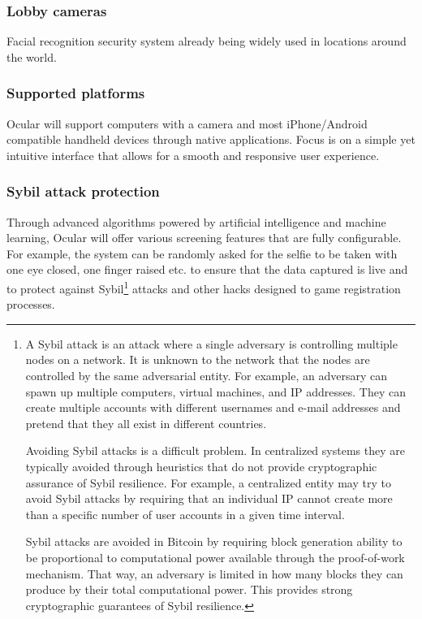 \documentclass[a4paper]{article}
\begin{document}
\subsubsection*{Lobby cameras}
Facial recognition security system already being widely used in locations around the world.

\subsubsection*{Supported platforms}

Ocular will support computers with a camera and most iPhone/Android compatible handheld devices through native applications. Focus is on a simple yet intuitive interface that allows for a smooth and responsive user experience.

\subsubsection*{Sybil attack protection}

Through advanced algorithms powered by artificial intelligence and machine learning, Ocular will offer various screening features that are fully configurable. For example, the system can be randomly asked for the selfie to be taken with one eye closed, one finger raised etc. to ensure that the data captured is live and to protect against Sybil\footnote{A Sybil attack is an attack where a single adversary is controlling multiple nodes on a network. It is unknown to the network that the nodes are controlled by the same adversarial entity. For example, an adversary can spawn up multiple computers, virtual machines, and IP addresses. They can create multiple accounts with different usernames and e-mail addresses and pretend that they all exist in different countries.

Avoiding Sybil attacks is a difficult problem. In centralized systems they are typically avoided through heuristics that do not provide cryptographic assurance of Sybil resilience. For example, a centralized entity may try to avoid Sybil attacks by requiring that an individual IP cannot create more than a specific number of user accounts in a given time interval.

Sybil attacks are avoided in Bitcoin by requiring block generation ability to be proportional to computational power available through the proof-of-work mechanism. That way, an adversary is limited in how many blocks they can produce by their total computational power. This provides strong cryptographic guarantees of Sybil resilience.} attacks and other hacks designed to game registration processes. 
\end{document}
